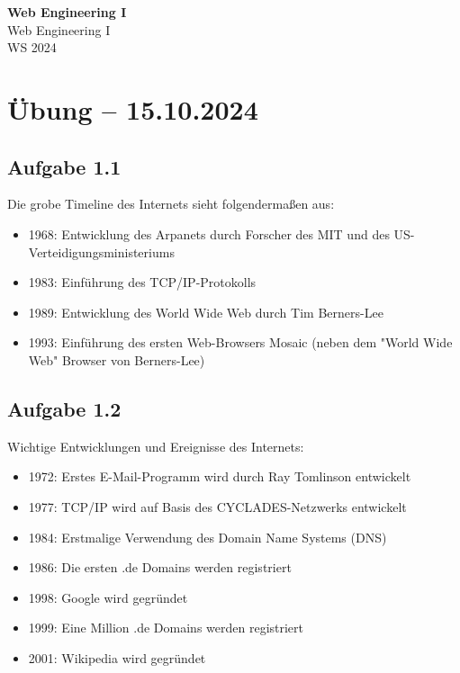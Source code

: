 \documentclass[11pt]{article}
\begin{document}
\thispagestyle{empty}

\newtheorem{definition}{Definition}[section]
\newtheorem{anmk}{Anmerkung}[section]
\newtheorem{bsp}{Beispiel}[section]
\newtheorem{aufgabe}{Aufgabe}[section]

\newcommand{\N}{\mathbb{N}}
\newcommand{\Z}{\mathbb{Z}}
\newcommand{\R}{\mathbb{R}}

\begin{center}
  {\LARGE \bf Web Engineering I}\\
  {\Large Web Engineering I}\\
  WS 2024
\end{center}

\section{Übung -- 15.10.2024}
\subsection{Aufgabe 1.1}
Die grobe Timeline des Internets sieht folgendermaßen aus:
\begin{itemize}
  \item 1968: Entwicklung des Arpanets durch Forscher des MIT und des US-Verteidigungsministeriums
  \item 1983: Einführung des TCP/IP-Protokolls
  \item 1989: Entwicklung des World Wide Web durch Tim Berners-Lee
  \item 1993: Einführung des ersten Web-Browsers Mosaic (neben dem "World Wide Web" Browser von Berners-Lee)
\end{itemize}

\subsection{Aufgabe 1.2}
Wichtige Entwicklungen und Ereignisse des Internets:
\begin{itemize}
  \item 1972: Erstes E-Mail-Programm wird durch Ray Tomlinson entwickelt
  \item 1977: TCP/IP wird auf Basis des CYCLADES-Netzwerks entwickelt
  \item 1984: Erstmalige Verwendung des Domain Name Systems (DNS)
  \item 1986: Die ersten .de Domains werden registriert
  \item 1998: Google wird gegründet
  \item 1999: Eine Million .de Domains werden registriert
  \item 2001: Wikipedia wird gegründet
\end{itemize}
\end{document}
